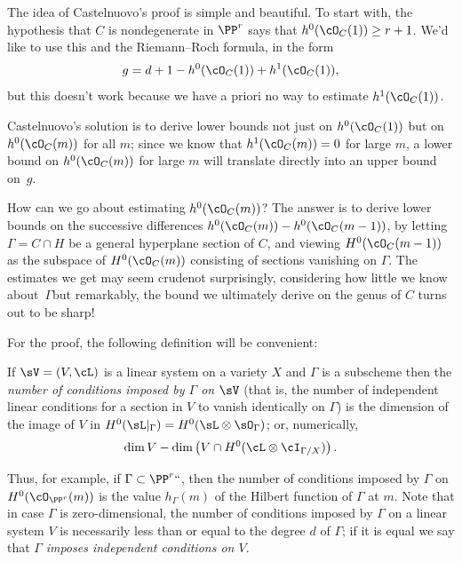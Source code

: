 The idea of Castelnuovo's proof is simple and beautiful. To start
with, the hypothesis that $C$ is nondegenerate in $\PP^r$ says that
$h^0(\cO_C(1)) \geq r+1$. We'd like to use this and the Riemann--Roch
formula, in the form
$$
g = d+1 - h^0(\cO_C(1)) + h^1(\cO_C(1)),
$$
but this doesn't work because we have a priori no way to estimate
$h^1(\cO_C(1))$.

Castelnuovo's solution  is to derive lower bounds not just on
$h^0(\cO_C(1))$ but on $h^0(\cO_C(m))$ for all $m$; since we know that
$h^1(\cO_C(m)) = 0$ for large $m$, a lower bound on $h^0(\cO_C(m))$
for large $m$ will translate directly into an upper bound on~$g$.

How can we go about estimating $h^0(\cO_C(m))$? The answer is to
derive lower bounds on the successive differences $h^0(\cO_C(m)) -
h^0(\cO_C(m-1))$, by letting $\Gamma = C \cap H$ be a general hyperplane
section of $C$, and viewing $H^0(\cO_C(m-1))$ as the subspace of
$H^0(\cO_C(m))$ consisting of sections vanishing on $\Gamma$. The
estimates we get may seem crude\emdash not surprisingly, considering
how little we know about~$\Gamma$\emdash but remarkably, the bound we
ultimately derive on the genus of $C$ turns out to be sharp!

For the proof, the following definition will be convenient:

\begin{definition}
If $\sV = (V,\cL)$ is a linear system on a variety $X$ and $\Gamma$
is a subscheme then the \emph{number of conditions imposed by $\Gamma$
%
on $\sV$} (that is, the number of 
independent linear conditions
%
for a
section in $V$ to vanish
identically on $\Gamma$) is the dimension of the image of $V$ in
$H^0(\sL|_\Gamma) = H^0(\sL \otimes \sO_\Gamma)$; or, numerically,
$$
\dim V - \dim \left(V \cap H^0(\cL\otimes \cI_{\Gamma/X}) \right).
$$
\end{definition}

Thus, for example, if $\Gamma \subset \PP^r` `$, then the number of
conditions imposed by $\Gamma$ on $H^0(\cO_{\PP^r}(m))$ is the value
$h_\Gamma(m)$ of the Hilbert function of $\Gamma$ at $m$.
Note that in case $\Gamma$ is zero-dimensional, the number of conditions
imposed by $\Gamma$ on a linear system $V$ is necessarily less than or
equal to the degree $d$ of $\Gamma$; if it is equal we say that $\Gamma$
\emph{imposes independent conditions on $V$}.

